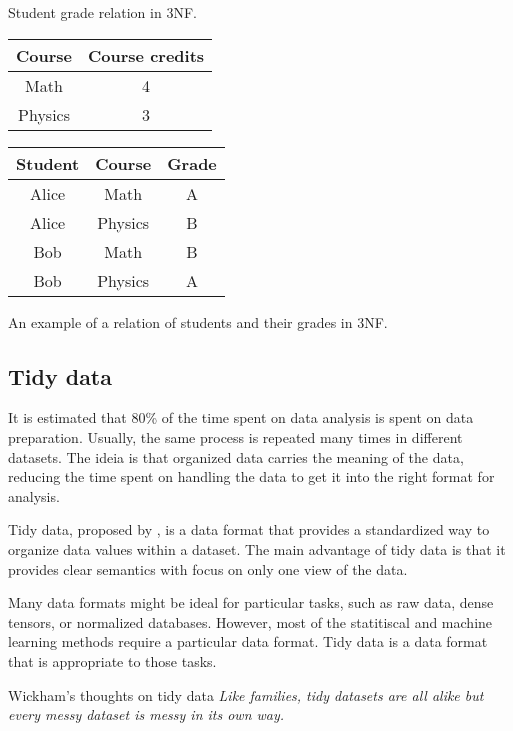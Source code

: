 \begin{tablebox}[label=tab:student-grade-illustration2]{Student grade relation in 3NF.}
  \centering
  \begin{tabular}{cc}
    \toprule
    \textbf{Course} & \textbf{Course credits} \\
    \midrule
    Math & 4 \\
    Physics & 3 \\
    \bottomrule
  \end{tabular}
  \quad
  \begin{tabular}{ccc}
    \toprule
    \textbf{Student} & \textbf{Course} & \textbf{Grade} \\
    \midrule
    Alice & Math & A \\
    Alice & Physics & B \\
    Bob & Math & B \\
    Bob & Physics & A \\
    \bottomrule
  \end{tabular}
  \tcblower
  An example of a relation of students and their grades in 3NF.
\end{tablebox}

\subsection{Tidy data}

It is estimated that 80\% of the time spent on data analysis is spent on data preparation.
Usually, the same process is repeated many times in different datasets. The ideia is that
organized data carries the meaning of the data, reducing the time spent on handling
the data to get it into the right format for analysis.

Tidy data, proposed by \textcite{Wickham2014},
is a data format that provides a standardized way to organize data values within
a dataset.  The main advantage of tidy data is that it provides clear semantics with focus
on only one view of the data.

Many data formats might be ideal for particular tasks, such as raw data, dense tensors, or
normalized databases.  However, most of the statitiscal and machine learning methods
require a particular data format.  Tidy data is a data format that is appropriate to those
tasks.

\begin{hlbox}{Wickham's thoughts on tidy data}
  \em
  Like families, tidy datasets are all alike but every messy dataset is messy in its own
  way.
\end{hlbox}

